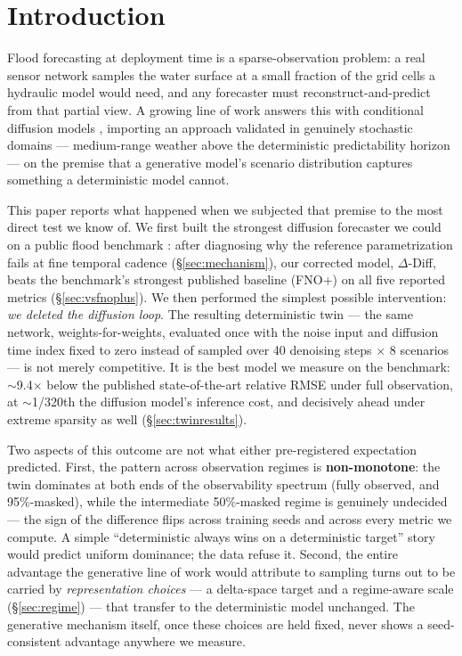 \documentclass[11pt]{article}
\newcommand{\ours}{\mbox{$\Delta$-Diff}}       %
\begin{document}
\section{Introduction}
\label{sec:intro}

Flood forecasting at deployment time is a sparse-observation problem: a
real sensor network samples the water surface at a small fraction of the
grid cells a hydraulic model would need, and any forecaster must
reconstruct-and-predict from that partial view. A growing line of work
answers this with conditional diffusion models
\citep{diffsparse2025,jamesstations2025,jamesocean2025,phyda2025},
importing an approach validated in genuinely stochastic domains ---
medium-range weather above the deterministic predictability horizon
\citep{gencast2024} --- on the premise that a generative model's scenario
distribution captures something a deterministic model cannot.

This paper reports what happened when we subjected that premise to the
most direct test we know of. We first built the strongest diffusion
forecaster we could on a public flood benchmark
\citep{floodcastbench2025}: after diagnosing why the reference
parametrization fails at fine temporal cadence (\S\ref{sec:mechanism}),
our corrected model, \ours{}, beats the benchmark's strongest published
baseline (FNO+) on all five reported metrics (\S\ref{sec:vsfnoplus}).
We then performed the simplest possible intervention: \emph{we deleted
the diffusion loop}. The resulting deterministic twin --- the same
network, weights-for-weights, evaluated once with the noise input and
diffusion time index fixed to zero instead of sampled over 40 denoising
steps $\times$ 8 scenarios --- is not merely competitive. It is the best
model we measure on the benchmark: $\sim$9.4$\times$ below the published
state-of-the-art relative RMSE under full observation, at
$\sim$1/320th the diffusion model's inference cost, and decisively ahead
under extreme sparsity as well (\S\ref{sec:twinresults}).

Two aspects of this outcome are not what either pre-registered
expectation predicted. First, the pattern across observation regimes is
\textbf{non-monotone}: the twin dominates at both ends of the
observability spectrum (fully observed, and 95\%-masked), while the
intermediate 50\%-masked regime is genuinely undecided --- the sign of
the difference flips across training seeds and across every metric we
compute. A simple ``deterministic always wins on a deterministic
target'' story would predict uniform dominance; the data refuse it.
Second, the entire advantage the generative line of work would attribute
to sampling turns out to be carried by \emph{representation choices} ---
a delta-space target and a regime-aware scale (\S\ref{sec:regime}) ---
that transfer to the deterministic model unchanged. The generative
mechanism itself, once these choices are held fixed, never shows a
seed-consistent advantage anywhere we measure.
\end{document}
